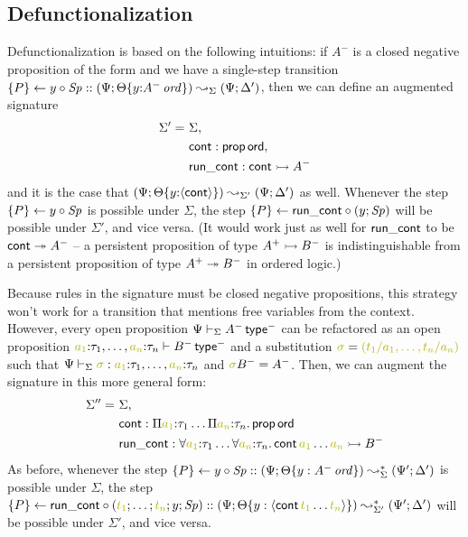 \subsection{Defunctionalization}
\label{sec:defunc-defunc}

Defunctionalization is based on the following intuitions:
if $A^-$ is a closed negative proposition
of the form 
and we have a single-step transition 
$\{{P}\} \leftarrow {y} \circ {{\it Sp}} :: (\Psi; {\Theta}\{{y{:}{A^-}\,{{\it ord}}}\}) 
 \leadsto_{\Sigma} 
 (\Psi; \Delta')$,
then we can define an augmented signature
\begin{align*}
\Sigma' = ~ & \Sigma, 
\\    ~~ & {\sf cont} : {\sf prop\,ord}, 
\\    ~~ & {\sf run\_cont} : {\sf cont} \rightarrowtail A^-
\end{align*}
and it is the case that 
$(\Psi; {\Theta}\{{y{:}\langle {\sf cont} \rangle}\}) 
 \leadsto_{\Sigma'} 
 (\Psi; \Delta')$
as well. Whenever the step $\{{P}\} \leftarrow {y} \circ {{\it Sp}}$ is possible under $\Sigma$,
the step $\{{P}\} \leftarrow {\sf run\_cont} \circ {(y; {\it Sp})}$ will be possible under $\Sigma'$,
and vice versa.  (It would work just as well for ${\sf run\_cont}$ to be ${\sf
  cont} \twoheadrightarrow A^-$ -- a persistent proposition of type $A^+ \rightarrowtail
B^-$ is indistinguishable from a persistent proposition of type $A^+
\twoheadrightarrow B^-$ in ordered logic.)

Because rules in the signature must be closed negative propositions,
this strategy won't work for a transition that mentions free variables
from the context. However, every open proposition $\Psi \vdash_\Sigma
A^-\,{\sf type}^-$ can be refactored as an open proposition 
$\lf{a_1}{:}\tau_1, \ldots, \lf{a_n}{:}\tau_n \vdash B^-\,{\sf type}^-$ and
a substitution $\lf{\sigma} = \lf{(t_1/a_1, \ldots, t_n/a_n)}$ such that
$\Psi \vdash_\Sigma \lf{\sigma} : \lf{a_1}{:}\tau_1, \ldots, \lf{a_n}{:}\tau_n$
and $\lf{\sigma}B^- = A^-$. Then, we can augment the signature in this 
more general form:
\begin{align*}
\Sigma'' = ~ & \Sigma, 
\\    ~~ & {\sf cont} :  \Pi\lf{a_1}{:}\tau_1\ldots \Pi\lf{a_n}{:}\tau_n.\,{\sf prop}\,{\sf ord}
\\    ~~ & {\sf run\_cont} : \forall\lf{a_1}{:}\tau_1\ldots \forall\lf{a_n}{:}\tau_n.\,{\sf cont}\,\lf{a_1}\ldots\lf{a_n} \lefti B^-
\end{align*}
As before, whenever the step $\{{P}\} \leftarrow {y} \circ {{\it Sp}} :: (\Psi;
{\Theta}\{{y : {A^-}\,{{\it ord}}}\}) \leadsto^*_{\Sigma} (\Psi';
\Delta')$ is possible under $\Sigma$, the step $\tstep{P}{\sf
  run\_cont}{(\lf{t_1}; \ldots; \lf{t_n}; y; \Sp)} ::
  (\Psi; \tackon{\Theta}{y : \susp{{\sf cont}\,\lf{t_1}\ldots\lf{t_n}}}) \leadsto^*_{\Sigma'} (\Psi';
\Delta')$ will be possible under
$\Sigma'$, and vice versa.

